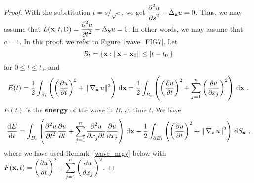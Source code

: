 
\begin{proof}
With the substitution $t = s/\sqrt{c}$, we get
$\displaystyle \pdydxn{u}{s}{2} - \Delta_{\VEC{x}} u = 0$.  Thus, we
may assume that
$\displaystyle L(\VEC{x},t,\diff) =
\pdydxn{u}{t}{2} - \Delta_{\VEC{x}} u = 0$.  In
other words, we may assume that $c=1$.  In this proof, we refer to
Figure~\ref{wave_FIG7}. Let
\[
B_t = \left\{ \VEC{x} : \|\VEC{x} - \VEC{x}_0\| \leq |t-t_0| \right\}
\]
for $0\leq t \leq t_0$, and
\[
E(t) = \frac{1}{2} \int_{B_t} \left(
\left(\pdydx{u}{t}\right)^2 + \|\graD_{\VEC{x}} u \|^2 \right) \dx{\VEC{x}}
= \frac{1}{2} \int_{B_t} \left( \left(\pdydx{u}{t}\right)^2 + \sum_{j=1}^n
\left(\pdydx{u}{x_j} \right)^2 \right) \dx{\VEC{x}} \ .
\]
$E(t)$ is the {\bfseries energy}
of the wave in $B_t$ at time $t$.  We have
\[
\dydx{E}{t} = \int_{B_t} \left( \pdydxn{u}{t}{2} \pdydx{u}{t} +
\sum_{j=1}^n \pdydxnm{u}{x_j}{t}{2}{}{} \pdydx{u}{x_j} \right) \dx{\VEC{x}}
- \frac{1}{2} \int_{\partial B_t} \left( \left(\pdydx{u}{t}\right)^2 +
\|\graD_{\VEC{x}} u \|^2 \right) \dss{S}{x} \ ,
\]
where we have used Remark~\ref{wave_nrgy} below with
$\displaystyle F(\VEC{x},t) = \left(\pdydx{u}{t}\right)^2 +
\sum_{j=1}^n \left(\pdydx{u}{x_j}\right)^2$.


\end{proof}
